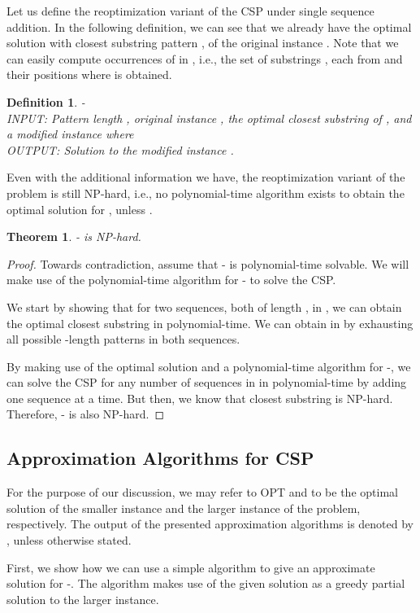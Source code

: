 \documentclass[journal]{acm_proc_article-sp}
\newtheorem{theorem}{Theorem}
\newtheorem{definition}{Definition}
\begin{document}
Let us define the reoptimization variant of the CSP under single sequence addition. In the following definition, we can see that we already have the optimal solution with closest substring pattern , of the original instance . Note that we can easily compute occurrences of  in , i.e., the set of substrings , each from  and their positions where  is obtained.
\begin{definition}{-} \ \\ INPUT: Pattern length , original instance , the optimal closest substring  of , and a modified instance  where \\
\noindent OUTPUT: Solution  to the modified instance .
\end{definition}
Even with the additional information we have, the reoptimization variant of the problem is still NP-hard, i.e., no polynomial-time algorithm exists to obtain the optimal solution for , unless . 
\begin{theorem} 
- is NP-hard.
\label{thm:hard}
\end{theorem}
\begin{proof}
Towards contradiction, assume that - is polynomial-time solvable. We will make use of the polynomial-time algorithm for - to solve the CSP. 

We start by showing that for two sequences, both of length , in , we can obtain the optimal closest substring  in polynomial-time. We can obtain  in  by exhausting all possible -length patterns in both sequences.

By making use of the optimal solution  and a polynomial-time algorithm for -, we can solve the CSP for any number of sequences in  in polynomial-time by adding one sequence at a time. But then, we know that closest substring is NP-hard. Therefore, - is also NP-hard.

\end{proof}

\subsection{Approximation Algorithms for CSP}

For the purpose of our discussion, we may refer to OPT and  to be the optimal solution of the smaller instance and the larger instance of the problem, respectively. The output of the presented approximation algorithms is denoted by , unless otherwise stated. 

First, we show how we can use a  simple algorithm to give an approximate solution for -. The algorithm  makes use of the given solution as a greedy partial solution to the larger instance. 
\end{document}
